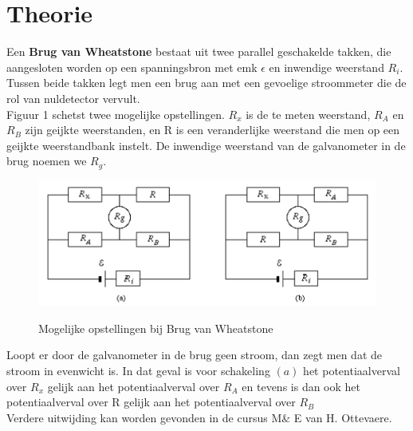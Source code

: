 \section{Theorie}

Een \textbf{Brug van Wheatstone} bestaat uit twee parallel geschakelde takken,
die aangesloten worden op een spanningsbron met emk $\epsilon$ en inwendige 
weerstand $R_{i}$. Tussen beide takken legt men een brug aan met een gevoelige
stroommeter die de rol van nuldetector vervult. 
\\

Figuur 1 schetst twee mogelijke opstellingen.
$R_{x}$ is de te meten weerstand, $R_{A}$ en $R_{B}$ zijn geijkte weerstanden, en R is een 
veranderlijke weerstand die men op een geijkte weerstandbank instelt. De inwendige weerstand 
van de galvanometer in de brug noemen we $R_{g}$.
\\

\begin{figure}[H]
    \centering
    \caption{Mogelijke opstellingen bij Brug van Wheatstone}
    \includegraphics[width=\textwidth]{img/brug.png}
    \label{fig:grafiek}
\end{figure}

Loopt er door de galvanometer in de brug geen stroom, dan zegt men dat de stroom in evenwicht is.
In dat geval is voor schakeling $(a)$ het potentiaalverval over $R_{x}$ gelijk aan het potentiaalverval 
over $R_{A}$ en tevens is dan ook het potentiaalverval over R gelijk aan het potentiaalverval over $R_{B}$
\\

Verdere uitwijding kan worden gevonden in de cursus M\& E
van H. Ottevaere\cite{cursusMnE}.
